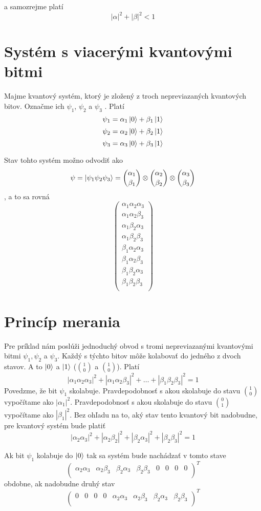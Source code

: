 a samozrejme platí
\[|\alpha|^{2} + |\beta|^{2} < 1\]

\section{Systém s viacerými kvantovými bitmi}
Majme kvantový systém, ktorý je zložený z troch nepreviazaných kvantových bitov.
Označme ich \(\psi_1\), \(\psi_2\) a \(\psi_3\) . Platí
\[\psi_1 = \alpha_1 \Ket{0} + \beta_1 \Ket{1}\]
\[\psi_2 = \alpha_2 \Ket{0} + \beta_2 \Ket{1}\]
\[\psi_3 = \alpha_3 \Ket{0} + \beta_3 \Ket{1}\]

Stav tohto systém možno odvodiť ako
\[\psi = \Ket{\psi_1 \psi_2 \psi_3} = \binom{\alpha_1}{\beta_1} \otimes \binom{\alpha_2}{\beta_2} \otimes \binom{\alpha_3}{\beta_3}\]
, a to sa rovná
\[
\begin{pmatrix}
    \alpha_1 \alpha_2 \alpha_3 \\
    \alpha_1 \alpha_2 \beta_3\\
    \alpha_1 \beta_2 \alpha_3\\
    \alpha_1 \beta_2 \beta_3\\
    \beta_1 \alpha_2 \alpha_3 \\
    \beta_1 \alpha_2 \beta_3\\
    \beta_1 \beta_2 \alpha_3\\
    \beta_1 \beta_2 \beta_3\\

 \end{pmatrix}
\]

\section{Princíp merania}
Pre príklad nám poslúži jednoduchý obvod s tromi nepreviazanými kvantovými 
bitmi \(\psi_1, \psi_2\) a \(\psi_3\). Každý s týchto bitov môže kolabovať do
jedného z dvoch stavov. A to \(\Ket{0}\) a \(\Ket{1}\) (\(\binom{1}{0}\) a
\(\binom{1}{0}\)). Platí
\[|\alpha_1\alpha_2\alpha_3|^2 + |\alpha_1\alpha_2\beta_3|^2 + \dots + |\beta_1\beta_2\beta_3|^2 = 1\]
Povedzme, že bit \(\psi_1\) skolabuje. Pravdepodobnosť s akou skolabuje do
stavu \(\binom{1}{0}\) vypočítame ako \(|\alpha_1|^2\). Pravdepodobnosť s akou 
skolabuje do stavu \(\binom{0}{1}\) vypočítame ako \(|\beta_1|^2\). Bez ohľadu
na to, aký stav tento kvantový bit nadobudne, pre kvantový systém bude platiť
\[|\alpha_2\alpha_3|^2 + |\alpha_2\beta_2|^2 + |\beta_2\alpha_3|^2 + |\beta_2\beta_3|^2 = 1\]

Ak bit \(\psi_1\) kolabuje do \(\Ket{0}\) tak sa systém bude nachádzať v tomto
stave
\[
\begin{pmatrix}
    \alpha_2 \alpha_3 &
    \alpha_2 \beta_3&
    \beta_2 \alpha_3&
    \beta_2 \beta_3&
    0&
    0&
    0&
    0\\
 \end{pmatrix}^T
\]
obdobne, ak nadobudne druhý stav
\[
\begin{pmatrix}
    0 & 0 & 0 & 0  & \alpha_2 \alpha_3 & \alpha_2 \beta_3 & \beta_2 \alpha_3 & \beta_2 \beta_3 \\
 \end{pmatrix}^T
\]
